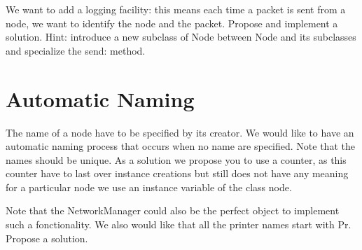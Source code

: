 We want to add a logging facility: this means each time a packet 
is sent from a node, we want to identify the node and the packet. 
Propose and implement a solution. Hint: introduce a new subclass 
of Node between Node and its subclasses and specialize the send: 
method. 




\section{Automatic Naming }


The name of a node have to be specified by its creator. We would 
like to have an automatic naming process that occurs when no 
name are specified. Note that the names should be unique. As 
a solution we propose you to use a counter, as this counter have 
to last over instance creations but still does not have any meaning 
for a particular node we use an instance variable of the class 
node.

Note that the NetworkManager could also be the perfect object 
to implement such a fonctionality.
We also would like that all the printer names start with Pr. 
Propose a solution. 


\endinput